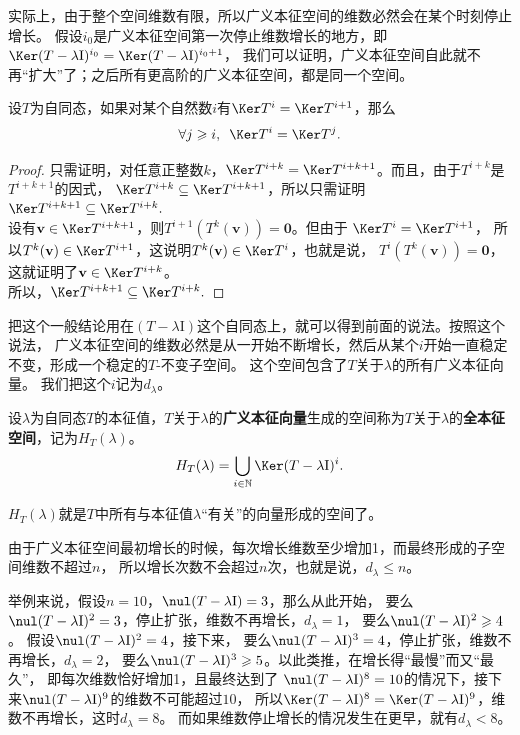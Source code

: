 \documentclass[12pt,UTF8]{ctexbook}
\begin{document}
实际上，由于整个空间维数有限，所以广义本征空间的维数必然会在某个时刻停止增长。
假设$i_0$是广义本征空间第一次停止维数增长的地方，即$\Ker (T - \lambda\mathrm{I})^{i_0} = \Ker (T - \lambda\mathrm{I})^{i_0+1}$，
我们可以证明，广义本征空间自此就不再“扩大”了；之后所有更高阶的广义本征空间，都是同一个空间。
\begin{pp}\label{pp:6_12_2}
    设$T$为自同态，如果对某个自然数$i$有$\Ker T^{i} = \Ker T^{i+1}$，那么
    $$ \forall j \geqslant i, \,\,\, \Ker T^{i} = \Ker T^{j}.$$
\end{pp}
\begin{proof} %
    只需证明，对任意正整数$k$，$\Ker T^{i+k} = \Ker T^{i+k+1}$。而且，由于$T^{i+k}$是$T^{i+k+1}$的因式，
    $\Ker T^{i+k} \subseteq \Ker T^{i+k+1}$，所以只需证明$\Ker T^{i+k+1} \subseteq \Ker T^{i+k}.$\\
    设有$\mathbf{v}\in\Ker T^{i+k+1}$，则$T^{i+1}(T^k(\mathbf{v})) = \mathbf{0}$。但由于 $\Ker T^{i} = \Ker T^{i+1}$，
    所以$T^k(\mathbf{v}) \in \Ker T^{i+1} $，这说明$T^k(\mathbf{v}) \in \Ker T^{i}$，也就是说，
    $T^{i}(T^k(\mathbf{v})) = \mathbf{0}$，这就证明了$\mathbf{v}\in\Ker T^{i+k}$。\\
    所以，$\Ker T^{i+k+1} \subseteq \Ker T^{i+k}.$

\end{proof}

把这个一般结论用在$(T - \lambda\mathrm{I})$这个自同态上，就可以得到前面的说法。按照这个说法，
广义本征空间的维数必然是从一开始不断增长，然后从某个$i$开始一直稳定不变，形成一个稳定的$T$-不变子空间。
这个空间包含了$T$关于$\lambda$的所有广义本征向量。
我们把这个$i$记为$d_\lambda$。
\begin{df}\label{df:6_4_2}
    设$\lambda$为自同态$T$的本征值，$T$关于$\lambda$的\textbf{广义本征向量}生成的空间称为$T$关于$\lambda$的\textbf{全本征空间}，记为$H_T(\lambda)$。
    $$ H_T(\lambda) = \bigcup_{i\in\mathbb{N}} \Ker (T - \lambda\mathrm{I})^i.$$
\end{df}
$H_T(\lambda)$就是$T$中所有与本征值$\lambda$“有关”的向量形成的空间了。

由于广义本征空间最初增长的时候，每次增长维数至少增加1，而最终形成的子空间维数不超过$n$，
所以增长次数不会超过$n$次，也就是说，$d_\lambda\leqslant n$。

举例来说，假设$n=10$，$\nul (T - \lambda\mathrm{I}) = 3$，那么从此开始，
要么$\nul (T - \lambda\mathrm{I})^2 = 3$，停止扩张，维数不再增长，$d_\lambda=1$，
要么$\nul (T - \lambda\mathrm{I})^2 \geqslant 4$。
假设$\nul (T - \lambda\mathrm{I})^2 = 4$，接下来，
要么$\nul (T - \lambda\mathrm{I})^3 = 4$，停止扩张，维数不再增长，$d_\lambda=2$，
要么$\nul (T - \lambda\mathrm{I})^3 \geqslant 5$。以此类推，在增长得“最慢”而又“最久”，
即每次维数恰好增加1，且最终达到了
$\nul (T - \lambda\mathrm{I})^8 = 10$的情况下，接下来$\nul (T - \lambda\mathrm{I})^9$的维数不可能超过$10$，
所以$\Ker (T - \lambda\mathrm{I})^8 = \Ker (T - \lambda\mathrm{I})^9$，维数不再增长，这时$d_\lambda=8$。
而如果维数停止增长的情况发生在更早，就有$d_\lambda<8$。
\end{document}
